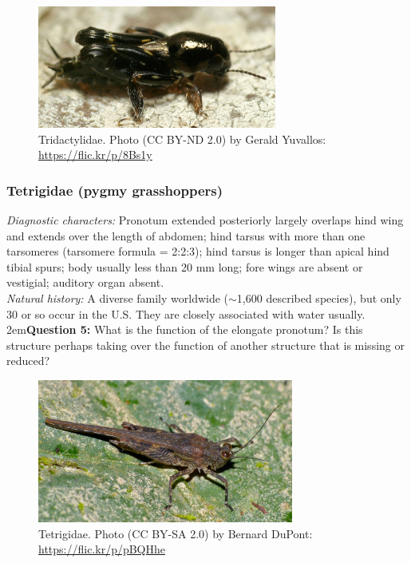 \documentclass[letterpaper, 11pt]{article}
\begin{document}
\begin{figure}[ht!]
  \centering
    \includegraphics[width=0.7\textwidth]{tridact}
  \caption{Tridactylidae. Photo (CC BY-ND 2.0) by Gerald Yuvallos: \url{https://flic.kr/p/8Bs1y}}
  \label{fig:tridact}
\end{figure}

\subsubsection{Tetrigidae (pygmy grasshoppers)}
\noindent{}\textit{Diagnostic characters:} Pronotum extended posteriorly largely overlaps hind wing and extends over the length of abdomen; hind tarsus with more than one tarsomeres (tarsomere formula = 2:2:3); hind tarsus is longer than apical hind tibial spurs; body usually less than 20 mm long; fore wings are absent or vestigial; auditory organ absent.\\

\noindent{}\textit{Natural history:} A diverse family worldwide ($\sim$1,600 described species), but only 30 or so occur in the U.S. They are closely associated with water usually.\\

\hangindent2em\textbf{Question 5:} What is the function of the elongate pronotum? Is this structure perhaps taking over the function of another structure that is missing or reduced?\\

\begin{figure}[ht!]
  \centering
    \includegraphics[width=0.75\textwidth]{tetrig1}
  \caption{Tetrigidae. Photo (CC BY-SA 2.0) by Bernard DuPont: \url{https://flic.kr/p/pBQHhe}}
  \label{fig:tetrig}
\end{figure}
\end{document}
